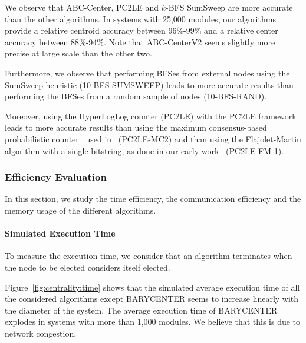 We observe that ABC-Center, PC2LE and $k$-BFS SumSweep are more accurate than the other algorithms. In systems with 25,000 modules, our algorithms provide a relative centroid accuracy between 96\%-99\% and a relative center accuracy between 88\%-94\%.  Note that ABC-CenterV2 seems slightly more precise at large scale than the other two.

Furthermore, we observe that performing BFSes from external nodes using the SumSweep heuristic (10-BFS-SUMSWEEP) leads to more accurate results than performing the BFSes from a random sample of nodes (10-BFS-RAND).

Moreover, using the HyperLogLog counter (PC2LE) with the PC2LE framework leads to more accurate results than using the maximum consensus-based probabilistic counter~\cite{varagnolo2010distributed} used in~\cite{garin2012distributed} (PC2LE-MC2) and than using the Flajolet-Martin algorithm with a single bitstring, as done in our early work~\cite{npgb16b:ip} (PC2LE-FM-1).


\subsubsection{Efficiency Evaluation}

In this section, we study the time efficiency, the communication efficiency and the memory usage of the different algorithms.

\paragraph{Simulated Execution Time}

To measure the execution time, we consider that an algorithm terminates when the node to be elected considers itself elected.

Figure~\ref{fig:centrality:time} shows that the simulated average execution time of all the considered algorithms except BARYCENTER seems to increase linearly with the diameter of the system. The average execution time of BARYCENTER explodes in systems with more than 1,000 modules. We believe that this is due to network congestion.

